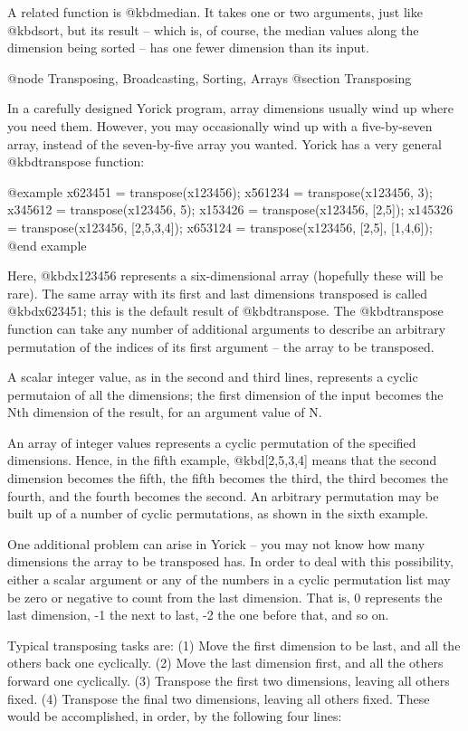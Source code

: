 A related function is @kbd{median}.  It takes one or two arguments, just
like @kbd{sort}, but its result -- which is, of course, the median
values along the dimension being sorted -- has one fewer dimension than
its input.



@node    Transposing, Broadcasting, Sorting, Arrays
@section Transposing

In a carefully designed Yorick program, array dimensions usually wind up
where you need them.  However, you may occasionally wind up with a
five-by-seven array, instead of the seven-by-five array you wanted.
Yorick has a very general @kbd{transpose} function:

@example
x623451 = transpose(x123456);
x561234 = transpose(x123456, 3);
x345612 = transpose(x123456, 5);
x153426 = transpose(x123456, [2,5]);
x145326 = transpose(x123456, [2,5,3,4]);
x653124 = transpose(x123456, [2,5], [1,4,6]);
@end example

Here, @kbd{x123456} represents a six-dimensional array (hopefully these
will be rare).  The same array with its first and last dimensions
transposed is called @kbd{x623451}; this is the default result of
@kbd{transpose}.  The @kbd{transpose} function can take any number of
additional arguments to describe an arbitrary permutation of the indices
of its first argument -- the array to be transposed.

A scalar integer value, as in the second and third lines, represents a
cyclic permutaion of all the dimensions; the first dimension of the
input becomes the Nth dimension of the result, for an argument value of
N.

An array of integer values represents a cyclic permutation of the
specified dimensions.  Hence, in the fifth example, @kbd{[2,5,3,4]}
means that the second dimension becomes the fifth, the fifth becomes the
third, the third becomes the fourth, and the fourth becomes the second.
An arbitrary permutation may be built up of a number of cyclic
permutations, as shown in the sixth example.

One additional problem can arise in Yorick -- you may not know how many
dimensions the array to be transposed has.  In order to deal with this
possibility, either a scalar argument or any of the numbers in a cyclic
permutation list may be zero or negative to count from the last
dimension.  That is, 0 represents the last dimension, -1 the next to
last, -2 the one before that, and so on.

Typical transposing tasks are: (1) Move the first dimension to be last,
and all the others back one cyclically.  (2) Move the last dimension
first, and all the others forward one cyclically.  (3) Transpose the
first two dimensions, leaving all others fixed.  (4) Transpose the final
two dimensions, leaving all others fixed.  These would be accomplished,
in order, by the following four lines:

